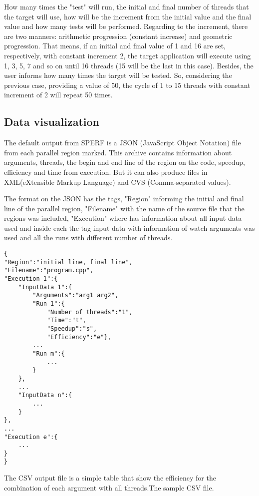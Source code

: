 \documentclass[sigconf]{acmart}
\begin{document}
How many times the "test" will run, the initial and final number of threads that the target will use, how will be the increment from the initial value and the final value and how many tests will be performed. Regarding to the increment, there are two manners: arithmetic progression (constant increase) and geometric progression. That means, if an initial and final value of 1 and 16 are set, respectively, with constant increment 2, the target application will execute using 1, 3, 5, 7 and so on until 16 threads (15 will be the last in this case). Besides, the user informs how many times the target will be tested. So, considering the previous case, providing a value of 50, the cycle of 1 to 15 threads with constant increment of 2 will repeat 50 times.

\subsection{Data visualization}
The default output from SPERF is a JSON (JavaScript Object Notation) file from each parallel region marked. This archive contains information about arguments, threads, the begin and end line of the region on the code, speedup, efficiency and time from execution. But it can also produce files in XML(eXtensible Markup Language) and CVS (Comma-separated values).

The format on the JSON has the tags, "Region" informing the initial and final line of the parallel region, "Filename" with the name of the source file that the regions was included, "Execution" where has information about all input data used and inside each the tag input data with information of watch arguments was used and all the runs with different number of threads.


\begin{lstlisting}
{
"Region":"initial line, final line",
"Filename":"program.cpp",
"Execution 1":{
	"InputData 1":{
		"Arguments":"arg1 arg2",
		"Run 1":{
			"Number of threads":"1",
			"Time":"t",
			"Speedup":"s",
			"Efficiency":"e"},
		...
		"Run m":{
			...
		}
	},
	...
	"InputData n":{
		...
	}
},
...
"Execution e":{
	...
}
}
\end{lstlisting}

The CSV output file is a simple table that show the efficiency for the combination of each argument with all threads.The sample CSV file.
\end{document}
